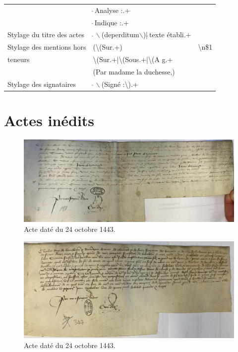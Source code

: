 \begin{center}
\begin{longtable}{|l|l|l|}
  & $\hat{~}$Analyse :.+ &  \\
  & $\hat{~}$Indique :.+ &  \\
Stylage du titre des actes & $\hat{~}\backslash$(deperditum$\backslash$)|$\hat{~}$texte établi.+ & \\
Stylage des mentions hors & (\textbackslash(Sur.+) & \textbackslash n\$1 \\ 
teneurs & \textbackslash(Sur.+|\textbackslash(Sous.+|\textbackslash(A g.+ &  \\
  & (Par madame la duchesse,) &  \\
Stylage des signataires & $\hat{~}\backslash$(Signé :\textbackslash).+ &  \\
  
\end{longtable}
\end{center}

\section*{Actes inédits}

\begin{figure}[ht]
\centering
\includegraphics[scale =0.13]{img/IMG-2553.jpg}
\caption*{Acte daté du 24 octobre 1443.}
\label{IMG-2553}
\end{figure}

\begin{figure}[ht]
\centering
\includegraphics[scale =0.12]{img/IMG-2568.jpg}
\caption*{Acte daté du 24 octobre 1443.}
\label{IMG-2568}
\end{figure}

